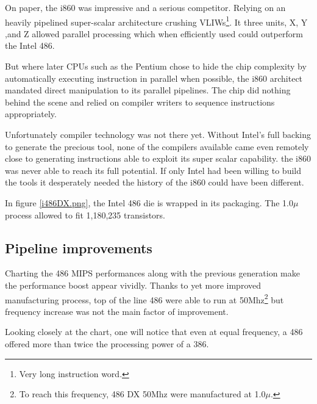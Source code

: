 On paper, the i860 was impressive and a serious competitor. Relying on an heavily pipelined super-scalar architecture crushing VLIWs\footnote{Very long instruction word.}. It three units, X, Y ,and Z allowed parallel processing which when efficiently used could outperform the Intel 486.\\
\par
But where later CPUs such as the Pentium chose to hide the chip complexity by automatically executing instruction in parallel when possible, the i860 architect mandated direct manipulation to its parallel pipelines. The chip did nothing behind the scene and relied on compiler writers to sequence instructions appropriately.\\
\par
Unfortunately compiler technology was not there yet. Without Intel's full backing to generate the precious tool, none of the compilers available came even remotely close to generating instructions able to exploit its super scalar capability. the i860 was never able to reach its full potential. If only Intel had been willing to build the tools it desperately needed the history of the i860 could have been different.\\
\par
\par
{}
\par
In figure \ref{i486DX.png}, the Intel 486 die is wrapped in its packaging. The 1.0$\mu$ process allowed to fit 1,180,235 transistors.\\
\par
{}

\par
\subsection{Pipeline improvements}
Charting the 486 MIPS performances along with the previous generation make the performance boost appear vividly. Thanks to yet more improved manufacturing process, top of the line 486 were able to run at 50Mhz\footnote{To reach this frequency, 486 DX 50Mhz were manufactured at 1.0$\mu$.} but frequency increase was not the main factor of improvement.\\
\par
 Looking closely at the chart, one will notice that even at equal frequency, a 486 offered more than twice the processing power of a 386.\\

